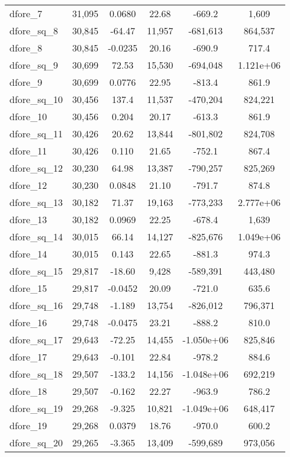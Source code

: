 \documentclass[]{article}
\begin{document}
\begin{center}
\begin{tabular}{lccccc}
dfore\_7 & 31,095 & 0.0680 & 22.68 & -669.2 & 1,609 \\
dfore\_sq\_8 & 30,845 & -64.47 & 11,957 & -681,613 & 864,537 \\
dfore\_8 & 30,845 & -0.0235 & 20.16 & -690.9 & 717.4 \\
dfore\_sq\_9 & 30,699 & 72.53 & 15,530 & -694,048 & 1.121e+06 \\
dfore\_9 & 30,699 & 0.0776 & 22.95 & -813.4 & 861.9 \\
dfore\_sq\_10 & 30,456 & 137.4 & 11,537 & -470,204 & 824,221 \\
dfore\_10 & 30,456 & 0.204 & 20.17 & -613.3 & 861.9 \\
dfore\_sq\_11 & 30,426 & 20.62 & 13,844 & -801,802 & 824,708 \\
dfore\_11 & 30,426 & 0.110 & 21.65 & -752.1 & 867.4 \\
dfore\_sq\_12 & 30,230 & 64.98 & 13,387 & -790,257 & 825,269 \\
dfore\_12 & 30,230 & 0.0848 & 21.10 & -791.7 & 874.8 \\
dfore\_sq\_13 & 30,182 & 71.37 & 19,163 & -773,233 & 2.777e+06 \\
dfore\_13 & 30,182 & 0.0969 & 22.25 & -678.4 & 1,639 \\
dfore\_sq\_14 & 30,015 & 66.14 & 14,127 & -825,676 & 1.049e+06 \\
dfore\_14 & 30,015 & 0.143 & 22.65 & -881.3 & 974.3 \\
dfore\_sq\_15 & 29,817 & -18.60 & 9,428 & -589,391 & 443,480 \\
dfore\_15 & 29,817 & -0.0452 & 20.09 & -721.0 & 635.6 \\
dfore\_sq\_16 & 29,748 & -1.189 & 13,754 & -826,012 & 796,371 \\
dfore\_16 & 29,748 & -0.0475 & 23.21 & -888.2 & 810.0 \\
dfore\_sq\_17 & 29,643 & -72.25 & 14,455 & -1.050e+06 & 825,846 \\
dfore\_17 & 29,643 & -0.101 & 22.84 & -978.2 & 884.6 \\
dfore\_sq\_18 & 29,507 & -133.2 & 14,156 & -1.048e+06 & 692,219 \\
dfore\_18 & 29,507 & -0.162 & 22.27 & -963.9 & 786.2 \\
dfore\_sq\_19 & 29,268 & -9.325 & 10,821 & -1.049e+06 & 648,417 \\
dfore\_19 & 29,268 & 0.0379 & 18.76 & -970.0 & 600.2 \\
dfore\_sq\_20 & 29,265 & -3.365 & 13,409 & -599,689 & 973,056 \\

\end{tabular}
\end{center}
\end{document}
